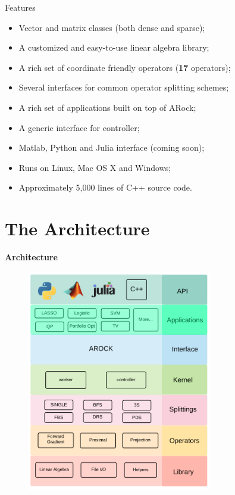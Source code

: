 \documentclass[hyperref,handout,compress,9pt,mathserif]{beamer}
\begin{document}
\begin{frame}{Features}
\begin{itemize}
\item Vector and matrix classes (both dense and sparse);
\item A customized and easy-to-use linear algebra library; 
\item A rich set of coordinate friendly operators (\textbf{17} operators);
\item Several interfaces for common operator splitting schemes; 
\item A rich set of applications built on top of ARock;
\item A generic interface for controller;
\item Matlab, Python and Julia interface (coming soon);
\item Runs on Linux, Mac OS X and Windows;
\item Approximately 5,000 lines of C++ source code.
\end{itemize}
\end{frame}

\section{The Architecture}
\begin{frame}\begin{center}\begin{Large}\textbf{Architecture}\end{Large}\end{center}\end{frame}

\begin{frame}
\begin{figure}[!h]
        \centering
                \includegraphics[width=0.72\textwidth]{./figs/architecture}
\end{figure}
\end{frame}
\end{document}
